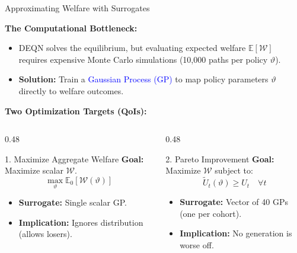 \documentclass[aspectratio=1610]{beamer}
\begin{document}
\begin{frame}{Approximating Welfare with Surrogates}

    \textbf{The Computational Bottleneck:}
    \begin{itemize}
        \item DEQN solves the equilibrium, but evaluating expected welfare $\mathbb{E}[\mathcal{W}]$ requires expensive Monte Carlo simulations (10,000 paths per policy $\vartheta$).
        \item \textbf{Solution:} Train a \textcolor{blue}{Gaussian Process (GP)} to map policy parameters $\vartheta$ directly to welfare outcomes.
    \end{itemize}

    \vspace{0.5em}

    \textbf{Two Optimization Targets (QoIs):}
    \begin{columns}[t]
        \begin{column}{0.48\textwidth}
            \begin{block}{1. Maximize Aggregate Welfare}
                \small
                \textbf{Goal:} Maximize scalar $\mathcal{W}$.
                \[ \max_\vartheta \mathbb{E}_0[\mathcal{W}(\vartheta)] \]
                \begin{itemize}
                    \item \textbf{Surrogate:} Single scalar GP.
                    \item \textbf{Implication:} Ignores distribution (allows losers).
                \end{itemize}
            \end{block}
        \end{column}

        \begin{column}{0.48\textwidth}
            \begin{block}{2. Pareto Improvement}
                \small
                \textbf{Goal:} Maximize $\mathcal{W}$ subject to:
                \[ \tilde{U}_t(\vartheta) \ge U_t \quad \forall t \]
                \begin{itemize}
                    \item \textbf{Surrogate:} Vector of 40 GPs (one per cohort).
                    \item \textbf{Implication:} No generation is worse off.
                \end{itemize}
            \end{block}
        \end{column}
    \end{columns}

\end{frame}
\end{document}
